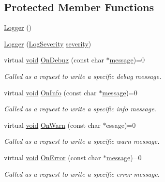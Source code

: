 \subsection*{Protected Member Functions}
\begin{DoxyCompactItemize}
\item 
\hyperlink{class_assimp_1_1_logger_a784e6d1a741072b17bab32a6a41055e8}{Logger} ()
\item 
\hyperlink{class_assimp_1_1_logger_accc0ffea63ddf0982d8c2ba7e07f0716}{Logger} (\hyperlink{class_assimp_1_1_logger_a8b6248a0fd062431e8572556350d29e6}{Log\-Severity} \hyperlink{_g_l_e_w_2glew_8h_aa9ef9fc6186ec914a859436da4764bca}{severity})
\item 
virtual \hyperlink{_s_d_l__opengl_8h_a3db05964a3cc4410f35b7ea2b7eb850d}{void} \hyperlink{class_assimp_1_1_logger_aded6996d20f14204877097b88bd5eac6}{On\-Debug} (const char $\ast$\hyperlink{_g_l_e_w_2glew_8h_ab5d4c2bfcb78f279c688575297d42f74}{message})=0
\begin{DoxyCompactList}\small\item\em Called as a request to write a specific debug message. \end{DoxyCompactList}\item 
virtual \hyperlink{_s_d_l__opengl_8h_a3db05964a3cc4410f35b7ea2b7eb850d}{void} \hyperlink{class_assimp_1_1_logger_aba81c4562ff8db83f06c6b62f2eb7983}{On\-Info} (const char $\ast$\hyperlink{_g_l_e_w_2glew_8h_ab5d4c2bfcb78f279c688575297d42f74}{message})=0
\begin{DoxyCompactList}\small\item\em Called as a request to write a specific info message. \end{DoxyCompactList}\item 
virtual \hyperlink{_s_d_l__opengl_8h_a3db05964a3cc4410f35b7ea2b7eb850d}{void} \hyperlink{class_assimp_1_1_logger_ab8066978dd37992f711d75d49cf4607b}{On\-Warn} (const char $\ast$essage)=0
\begin{DoxyCompactList}\small\item\em Called as a request to write a specific warn message. \end{DoxyCompactList}\item 
virtual \hyperlink{_s_d_l__opengl_8h_a3db05964a3cc4410f35b7ea2b7eb850d}{void} \hyperlink{class_assimp_1_1_logger_ae2ea0790aba6125b90af0f2768b0759d}{On\-Error} (const char $\ast$\hyperlink{_g_l_e_w_2glew_8h_ab5d4c2bfcb78f279c688575297d42f74}{message})=0
\begin{DoxyCompactList}\small\item\em Called as a request to write a specific error message. \end{DoxyCompactList}\end{DoxyCompactItemize}
